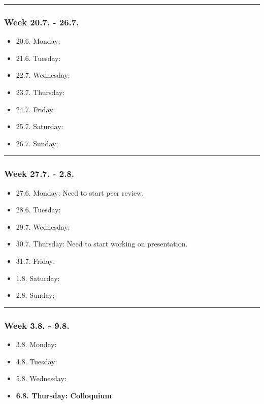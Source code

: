 \hrule
\subsubsection*{Week 20.7. - 26.7.}
\begin{itemize}
  \item 20.6. Monday:
  \item 21.6. Tuesday:
  \item 22.7. Wednesday:
  \item 23.7. Thursday:
  \item 24.7. Friday:
  \item 25.7. Saturday:
  \item 26.7. Sunday;
\end{itemize}

\clearpage
\hrule
\subsubsection*{Week 27.7. - 2.8.}
\begin{itemize}
  \item 27.6. Monday: Need to start peer review.
  \item 28.6. Tuesday:
  \item 29.7. Wednesday:
  \item 30.7. Thursday: Need to start working on presentation.
  \item 31.7. Friday:
  \item  1.8. Saturday:
  \item  2.8. Sunday;
\end{itemize}

\hrule
\subsubsection*{Week 3.8. - 9.8.}
\begin{itemize}
  \item  3.8. Monday:
  \item  4.8. Tuesday:
  \item  5.8. Wednesday:
  \item \textbf{6.8. Thursday: Colloquium}
\end{itemize}
